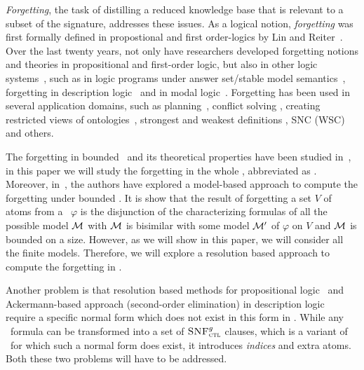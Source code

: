 \documentclass[letterpaper]{article}
\begin{document}
\emph{Forgetting}, the task of distilling a reduced knowledge base that is relevant to a subset of the signature, addresses these issues.
As a logical notion, \emph{forgetting} was first formally defined
in propostional and first order-logics by Lin and Reiter~\cite{lin1994forget}.
Over the last twenty years, not only have researchers developed forgetting notions and theories in propositional and first-order logic, but also in other logic systems~\cite{eiter2019brief}, such as in logic programs under answer set/stable model semantics~\cite{DBLP:Zhang:AIJ2006,Eiter2008Semantic,Wong:PhD:Thesis,Yisong:KR:2012,Yisong:IJCAI:2013}, forgetting in description logic~\cite{Wang:AMAI:2010,Lutz:IJCAI:2011,zhao2017role} and in modal logic~\cite{Yan:AIJ:2009,Kaile:JAIR:2009,Yongmei:IJCAI:2011,fang2019forgetting}. Forgetting has been used in several application domains, such as planning~\cite{lin2003compiling},  conflict solving \cite{Lang2010Reasoning,Zhang2005Solving},
creating restricted views of ontologies~\cite{zhao2017role},
strongest and weakest definitions \cite{Lang2008On}, SNC (WSC) \cite{DBLP:journals/ai/Lin01} and others.


The forgetting in bounded \CTL\ and  its theoretical properties have been studied in~\cite{renyansfirstpaper}, in this paper we will study the forgetting in the whole \CTL, abbreviated as \CTL. Moreover, in~\cite{renyansfirstpaper}, the authors have explored a model-based approach to compute the forgetting under bounded \CTL. It is show that the result of forgetting a set $V$ of atoms from a \CTL\ $\varphi$ is the disjunction of the characterizing formulas of all the possible model ${\cal M}$ with ${\cal M}$ is bisimilar with some model ${\cal M}'$ of $\varphi$ on $V$ and ${\cal M}$ is bounded on a size. However, as we will show in this paper, we will consider all the finite models. Therefore, we will explore a resolution based approach to compute the forgetting in \CTL.


Another problem is that resolution based methods for propositional logic~\cite{lin1994forget,Yisong:2015:arx} and Ackermann-based approach (second-order elimination) in description logic~\cite{Zhao:2017:IJCAI} require a specific normal form which does not exist in this form in \CTL.
While any \CTL\ formula can be transformed into a set of ${\textsc{SNF}_{\textsc{ctl}}^g}$ clauses, which is a variant of \CTL\ for which such a normal form does exist, it introduces \emph{indices} and extra atoms. Both these two problems will have to be addressed.
\end{document}
